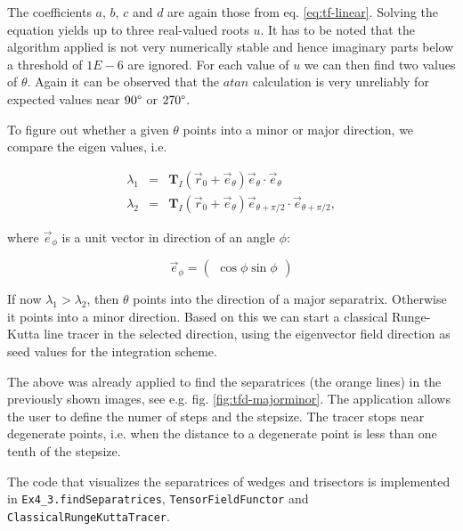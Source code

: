 \documentclass[a4paper,10pt,notitlepage]{scrartcl}
\newcommand{\mat}[1]{\mathbf{#1}}
\begin{document}
The coefficients $a$, $b$, $c$ and $d$ are again those from eq.
\ref{eq:tf-linear}. Solving the equation yields up to three real-valued roots
$u$. It has to be noted that the algorithm applied is not very numerically
stable and hence imaginary parts below a threshold of $1E-6$ are ignored. For
each value of $u$ we can then find two values of $\theta$. Again it can be
observed that the $atan$ calculation is very unreliably for expected values
near $90\degree$ or $270\degree$.

To figure out whether a given $\theta$ points into a minor or major direction,
we compare the eigen values, i.e.

\begin{eqnarray}
 \lambda_1 &=& \mat{T}_I(\vec{r}_0 + \vec{e}_\theta) \vec{e}_\theta \cdot
\vec{e}_\theta \\
 \lambda_2 &=& \mat{T}_I(\vec{r}_0 + \vec{e}_\theta) \vec{e}_{\theta+\pi/2}
\cdot
\vec{e}_{\theta+\pi/2},
\end{eqnarray}

where $\vec{e}_{\phi}$ is a unit vector in direction of an angle $\phi$:

\begin{equation}
 \vec{e}_{\phi} = \left( \begin{array}{c}
                          \cos \phi
                          \sin \phi
                         \end{array} \right )
\end{equation}

If now $\lambda_1 > \lambda_2$, then $\theta$ points into the direction of a
major separatrix. Otherwise it points into a minor direction. Based on this we
can start a classical Runge-Kutta line tracer in the selected direction, using
the eigenvector field direction as seed values for the integration scheme.

The above was already applied to find the separatrices (the orange lines) in the
previously shown images, see e.g. fig. \ref{fig:tfd-majorminor}. The
application allows the user to define the numer of steps and the stepsize. The
tracer stops near degenerate points, i.e. when the distance to a degenerate
point is less than one tenth of the stepsize.

The code that visualizes the separatrices of wedges and trisectors is
implemented in \texttt{Ex4\_3.findSeparatrices},
\texttt{TensorFieldFunctor} and \texttt{ClassicalRungeKuttaTracer}.


\end{document}
